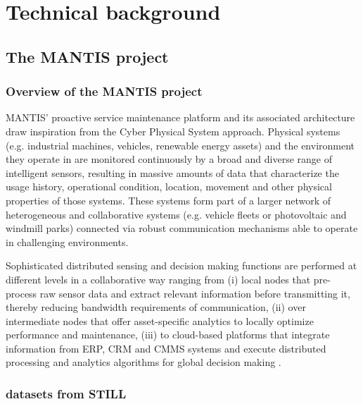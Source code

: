 \chapter{Technical background}
	\section{The MANTIS project}
		\subsection{Overview of the MANTIS project}
MANTIS’ proactive service maintenance platform and its associated architecture draw inspiration from the Cyber Physical System approach. Physical systems (e.g. industrial machines, vehicles, renewable energy assets) and the environment they operate in are monitored continuously by a broad and diverse range of intelligent sensors, resulting in massive amounts of data that characterize the usage history, operational condition, location, movement and other physical properties of those systems. These systems form part of a larger network of heterogeneous and collaborative systems (e.g. vehicle fleets or photovoltaic and windmill parks) connected via robust communication mechanisms able to operate in challenging environments.

Sophisticated distributed sensing and decision making functions are performed at different levels in a collaborative way ranging from (i) local nodes that pre-process raw sensor data and extract relevant information before transmitting it, thereby reducing bandwidth requirements of communication, (ii) over intermediate nodes that offer asset-specific analytics to locally optimize performance and maintenance, (iii) to cloud-based platforms that integrate information from ERP, CRM and CMMS systems and execute distributed processing and analytics algorithms for global decision making \cite{Mantis}.

		\subsection{datasets from STILL}
